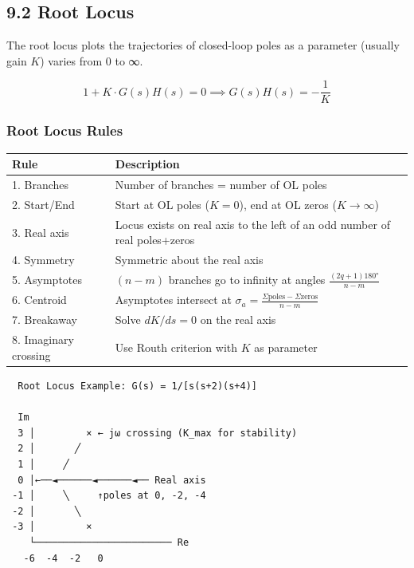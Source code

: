 \documentclass[11pt,a4paper]{book}
\begin{document}
\medskip\noindent\hrulefill\medskip

\subsection{9.2 Root Locus}

The root locus plots the trajectories of closed-loop poles as a parameter (usually gain $K$) varies from 0 to ∞.

\[1 + K \cdot G(s)H(s) = 0 \implies G(s)H(s) = -\frac{1}{K}\]

\subsubsection{Root Locus Rules}

\begin{center}
\begin{tabular}{|l|l|}
\hline
Rule & Description \\
\hline
1. Branches & Number of branches = number of OL poles \\
2. Start/End & Start at OL poles ($K=0$), end at OL zeros ($K→∞$) \\
3. Real axis & Locus exists on real axis to the left of an odd number of real poles+zeros \\
4. Symmetry & Symmetric about the real axis \\
5. Asymptotes & $(n-m)$ branches go to infinity at angles $\frac{(2q+1)180°}{n-m}$ \\
6. Centroid & Asymptotes intersect at $\sigma_a = \frac{\Sigma\text{poles} - \Sigma\text{zeros}}{n-m}$ \\
7. Breakaway & Solve $dK/ds = 0$ on the real axis \\
8. Imaginary crossing & Use Routh criterion with $K$ as parameter \\
\hline
\end{tabular}
\end{center}

\begin{lstlisting}
  Root Locus Example: G(s) = 1/[s(s+2)(s+4)]
  
  Im
  3 │         × ← jω crossing (K_max for stability)
  2 │       ╱   
  1 │     ╱     
  0 │←──◄──────◄──────◄── Real axis
 -1 │     ╲     ↑poles at 0, -2, -4
 -2 │       ╲   
 -3 │         ×
    └──────────────────────── Re
   -6  -4  -2   0
\end{lstlisting}

\medskip\noindent\hrulefill\medskip
\end{document}
